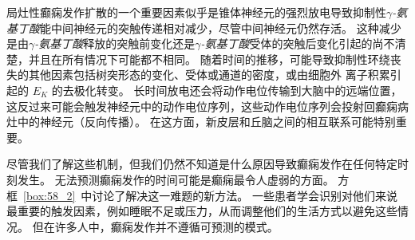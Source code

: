 局灶性癫痫发作扩散的一个重要因素似乎是锥体神经元的强烈放电导致抑制性\textit{$\gamma$-氨基丁酸}能中间神经元的突触传递相对减少，尽管中间神经元仍然存活。
这种减少是由\textit{$\gamma$-氨基丁酸}释放的突触前变化还是\textit{$\gamma$-氨基丁酸}受体的突触后变化引起的尚不清楚，并且在所有情况下可能都不相同。
随着时间的推移，可能导致抑制性环绕丧失的其他因素包括树突形态的变化、受体或通道的密度，或由细胞外  离子积累引起的 $ E_K $ 的去极化转变。
长时间放电还会将动作电位传输到大脑中的远端位置，这反过来可能会触发神经元中的动作电位序列，这些动作电位序列会投射回癫痫病灶中的神经元（反向传播）。
在这方面，新皮层和丘脑之间的相互联系可能特别重要。


尽管我们了解这些机制，但我们仍然不知道是什么原因导致癫痫发作在任何特定时刻发生。
无法预测癫痫发作的时间可能是癫痫最令人虚弱的方面。
方框~\ref{box:58_2}~中讨论了解决这一难题的新方法。
一些患者学会识别对他们来说最重要的触发因素，例如睡眠不足或压力，从而调整他们的生活方式以避免这些情况。
但在许多人中，癫痫发作并不遵循可预测的模式。


